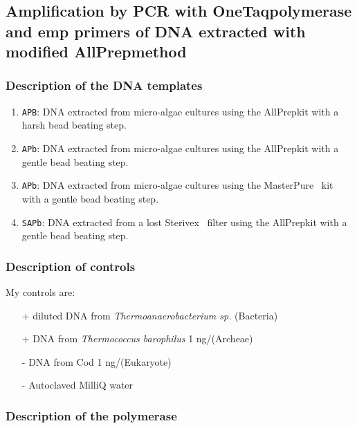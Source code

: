 \subsection{Amplification by PCR with OneTaq\cR polymerase and \gls{emp} primers of DNA extracted with modified AllPrep\cR method}
\label{task:20180322_cj0}

\subsubsection{Description of the DNA templates}

\begin{enumerate}
\item \texttt{APB}: DNA extracted from micro-algae cultures using the AllPrep\cR kit with a harsh bead beating step.
\item \texttt{APb}: DNA extracted from micro-algae cultures using the AllPrep\cR kit with a gentle bead beating step.
\item \texttt{APb}: DNA extracted from micro-algae cultures using the MasterPure\texttrademark~ kit with a gentle bead beating step.
\item \texttt{SAPb}: DNA extracted from a lost Sterivex\texttrademark~ filter using the AllPrep\cR kit with a gentle bead beating step.
\end{enumerate}

\subsubsection{Description of controls}
My controls are:
\begin{itemize}
\item[+] diluted DNA from \textit{Thermoanaerobacterium sp.} (Bacteria)
\item[+] DNA from \textit{Thermococcus barophilus} 1 ng/\uL (Archeae)
\item[-] DNA from Cod 1 ng/\uL (Eukaryote)
\item[-] Autoclaved MilliQ water
\end{itemize}

\subsubsection{Description of the polymerase}

